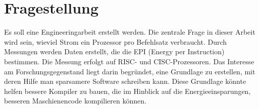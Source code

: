 \section{Fragestellung}

Es soll eine Engineeringarbeit erstellt werden. Die zentrale Frage in dieser Arbeit wird sein, wieviel Strom ein Prozessor pro Befehlsatz
verbraucht. Durch Messungen werden Daten erstellt, die die EPI (Energy per Instruction)
bestimmen. Die Messung erfolgt auf RISC- und CISC-Prozessoren. Das Interesse am Forschungsgegenstand liegt darin begründet, eine Grundlage
zu erstellen, mit deren Hilfe man sparsamere Software schreiben kann. Diese Grundlage könnte helfen bessere Kompiler zu bauen,
die im Hinblick auf die Energieeinsparungen, besseren Maschienencode kompilieren können. 

